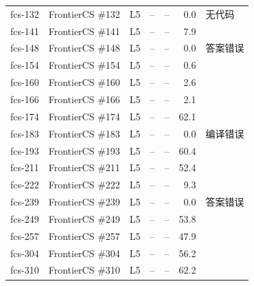 \documentclass[11pt,a4paper,fontset=none]{ctexart}
\begin{document}
{\begin{longtable}{@{}l>{\raggedright\arraybackslash}p{3.4cm}llrr>{\raggedright\arraybackslash}p{3.1cm}@{}}
fcs-132 & FrontierCS \#132 & L5 & – & – & 0.0 & 无代码 \\
fcs-141 & FrontierCS \#141 & L5 & – & – & 7.9 &  \\
fcs-148 & FrontierCS \#148 & L5 & – & – & 0.0 & 答案错误 \\
fcs-154 & FrontierCS \#154 & L5 & – & – & 0.6 &  \\
fcs-160 & FrontierCS \#160 & L5 & – & – & 2.6 &  \\
fcs-166 & FrontierCS \#166 & L5 & – & – & 2.1 &  \\
fcs-174 & FrontierCS \#174 & L5 & – & – & 62.1 &  \\
fcs-183 & FrontierCS \#183 & L5 & – & – & 0.0 & 编译错误 \\
fcs-193 & FrontierCS \#193 & L5 & – & – & 60.4 &  \\
fcs-211 & FrontierCS \#211 & L5 & – & – & 52.4 &  \\
fcs-222 & FrontierCS \#222 & L5 & – & – & 9.3 &  \\
fcs-239 & FrontierCS \#239 & L5 & – & – & 0.0 & 答案错误 \\
fcs-249 & FrontierCS \#249 & L5 & – & – & 53.8 &  \\
fcs-257 & FrontierCS \#257 & L5 & – & – & 47.9 &  \\
fcs-304 & FrontierCS \#304 & L5 & – & – & 56.2 &  \\
fcs-310 & FrontierCS \#310 & L5 & – & – & 62.2 &  \\
\bottomrule
\end{longtable}}
\end{document}
